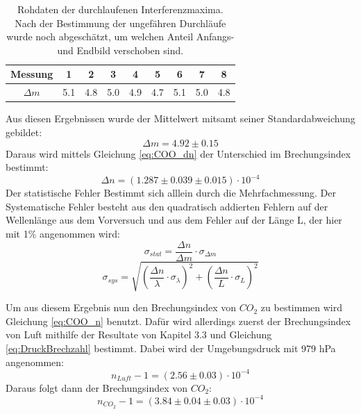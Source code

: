 \documentclass[12pt,a4paper]{article}
\begin{document}
\begin{table}
\center
\begin{tabular}{|c|c|c|c|c|c|c|c|c|}
\hline
Messung & 1 & 2 & 3 & 4 & 5 & 6 & 7 & 8\\
\hline
$\Delta m$ & 5.1 & 4.8 & 5.0 & 4.9 & 4.7 & 5.1 & 5.0 & 4.8\\
\hline
\end{tabular}
\caption{Rohdaten der durchlaufenen Interferenzmaxima. Nach der Bestimmung der ungefähren Durchläufe wurde noch abgeschätzt, um welchen Anteil Anfangs- und Endbild verschoben sind.}
\label{tab:COO_Rohdaten}
\end{table}

Aus diesen Ergebnissen wurde der Mittelwert mitsamt seiner Standardabweichung gebildet:
\begin{equation}
\Delta m = 4.92 \pm 0.15
\end{equation}
Daraus wird mittels Gleichung \ref{eq:COO_dn} der Unterschied im Brechungsindex bestimmt:
\begin{equation}
\Delta n = (1.287 \pm 0.039 \pm 0.015)\cdot 10^{-4}
\end{equation}
Der statistische Fehler Bestimmt sich alllein durch die Mehrfachmessung.
Der Systematische Fehler besteht aus den quadratisch addierten Fehlern auf der Wellenlänge aus dem Vorversuch und aus dem Fehler auf der Länge L, der hier mit 1\% angenommen wird:
\begin{equation}
\sigma_{stat} = \dfrac{\Delta n}{\Delta m} \cdot \sigma_{\Delta m}
\end{equation}
\begin{equation}
\sigma_{sys} = \sqrt{\left(\dfrac{\Delta n}{\lambda} \cdot \sigma_{\lambda}\right)^2 + \left(\dfrac{\Delta n}{L} \cdot \sigma_{L}\right)^2}
\end{equation}

Um aus diesem Ergebnis nun den Brechungsindex von $CO_2$ zu bestimmen wird Gleichung \ref{eq:COO_n} benutzt. Dafür wird allerdings zuerst der Brechungsindex von Luft mithilfe der Resultate von Kapitel 3.3 und Gleichung \ref{eq:DruckBrechzahl} bestimmt. Dabei wird der Umgebungsdruck mit 979 hPa angenommen:
\begin{equation}
n_{Luft}-1 = (2.56 \pm 0.03)\cdot 10^{-4}
\end{equation}
Daraus folgt dann der Brechungsindex von $CO_2$:
\begin{equation}
n_{CO_2}-1 = (3.84 \pm 0.04 \pm 0.03)\cdot 10^{-4}
\end{equation}
\end{document}
